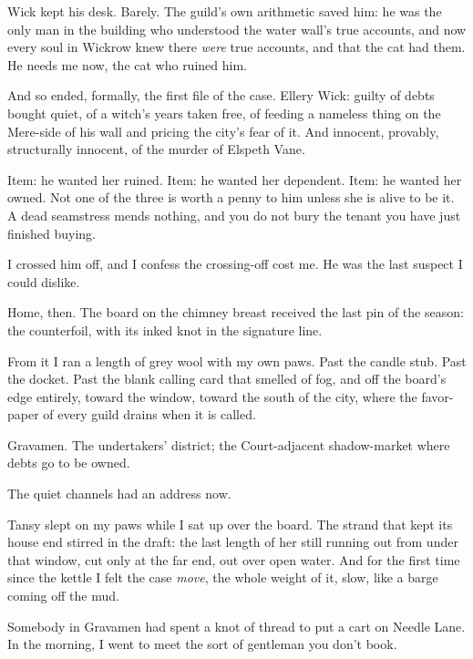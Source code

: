 Wick kept his desk. Barely. The guild's own arithmetic saved him: he was the only man in the building who understood the water wall's true accounts, and now every soul in Wickrow knew there \emph{were} true accounts, and that the cat had them. He needs me now, the cat who ruined him.

And so ended, formally, the first file of the case. Ellery Wick: guilty of debts bought quiet, of a witch's years taken free, of feeding a nameless thing on the Mere-side of his wall and pricing the city's fear of it. And innocent, provably, structurally innocent, of the murder of Elspeth Vane.

Item: he wanted her ruined. Item: he wanted her dependent. Item: he wanted her owned. Not one of the three is worth a penny to him unless she is alive to be it. A dead seamstress mends nothing, and you do not bury the tenant you have just finished buying.

I crossed him off, and I confess the crossing-off cost me. He was the last suspect I could dislike.

Home, then. The board on the chimney breast received the last pin of the season: the counterfoil, with its inked knot in the signature line.

From it I ran a length of grey wool with my own paws. Past the candle stub. Past the docket. Past the blank calling card that smelled of fog, and off the board's edge entirely, toward the window, toward the south of the city, where the favor-paper of every guild drains when it is called.

Gravamen. The undertakers' district; the Court-adjacent shadow-market where debts go to be owned.

The quiet channels had an address now.

Tansy slept on my paws while I sat up over the board. The strand that kept its house end stirred in the draft: the last length of her still running out from under that window, cut only at the far end, out over open water. And for the first time since the kettle I felt the case \emph{move}, the whole weight of it, slow, like a barge coming off the mud.

Somebody in Gravamen had spent a knot of thread to put a cart on Needle Lane. In the morning, I went to meet the sort of gentleman you don't book.
